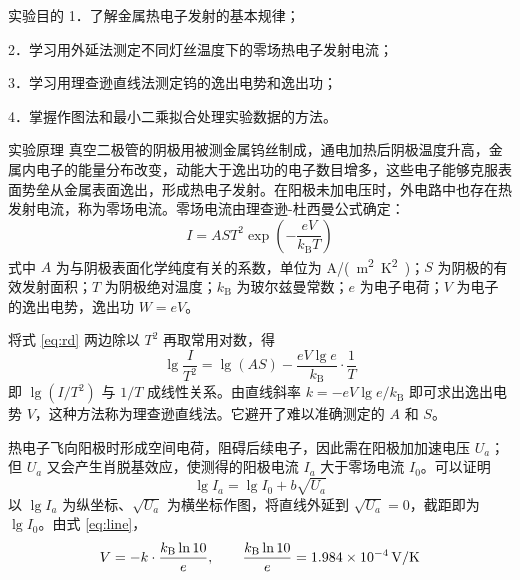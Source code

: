 \documentclass{labreport}
\begin{document}
\makecover

\begin{labsection}{实验目的}
1．了解金属热电子发射的基本规律；\par
2．学习用外延法测定不同灯丝温度下的零场热电子发射电流；\par
3．学习用理查逊直线法测定钨的逸出电势和逸出功；\par
4．掌握作图法和最小二乘拟合处理实验数据的方法。
\end{labsection}

\begin{labsection}{实验原理}
真空二极管的阴极用被测金属钨丝制成，通电加热后阴极温度升高，金属内电子的能量分布改变，动能大于逸出功的电子数目增多，这些电子能够克服表面势垒从金属表面逸出，形成热电子发射。在阳极未加电压时，外电路中也存在热发射电流，称为零场电流。零场电流由理查逊-杜西曼公式确定：
\begin{equation}
  I = AST^2 \exp\left(-\frac{eV}{k_\mathrm{B}T}\right)
  \label{eq:rd}
\end{equation}
式中 $A$ 为与阴极表面化学纯度有关的系数，单位为 \si{A/(m^2.K^2)}；$S$ 为阴极的有效发射面积；$T$ 为阴极绝对温度；$k_\mathrm{B}$ 为玻尔兹曼常数；$e$ 为电子电荷；$V$ 为电子的逸出电势，逸出功 $W=eV$。

将式 \eqref{eq:rd} 两边除以 $T^2$ 再取常用对数，得
\begin{equation}
  \lg\frac{I}{T^2} = \lg(AS) - \frac{eV\lg e}{k_\mathrm{B}}\cdot\frac{1}{T}
  \label{eq:line}
\end{equation}
即 $\lg(I/T^2)$ 与 $1/T$ 成线性关系。由直线斜率 $k=-eV\lg e/k_\mathrm{B}$ 即可求出逸出电势 $V$，这种方法称为理查逊直线法。它避开了难以准确测定的 $A$ 和 $S$。

热电子飞向阳极时形成空间电荷，阻碍后续电子，因此需在阳极加加速电压 $U_a$；但 $U_a$ 又会产生肖脱基效应，使测得的阳极电流 $I_a$ 大于零场电流 $I_0$。可以证明
\begin{equation}
  \lg I_a = \lg I_0 + b\sqrt{U_a}
  \label{eq:schottky}
\end{equation}
以 $\lg I_a$ 为纵坐标、$\sqrt{U_a}$ 为横坐标作图，将直线外延到 $\sqrt{U_a}=0$，截距即为 $\lg I_0$。由式 \eqref{eq:line}，
\begin{equation}
  V = -k\cdot\frac{k_\mathrm{B}\ln 10}{e},\qquad \frac{k_\mathrm{B}\ln 10}{e}=\num{\KbLnE}\,\si{V/K}
  \label{eq:v}
\end{equation}
\end{labsection}
\end{document}
